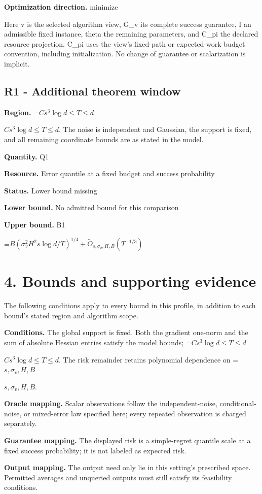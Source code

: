 \documentclass[10pt,a4paper]{article}
\newcommand{\AtlasMath}[1]{\par\begingroup\centering\setbox0=\hbox{$\displaystyle #1$}\ifdim\wd0>1.4\linewidth\typeout{ATLAS WIDE FORMULA: \the\wd0}\fi\ifdim\wd0>\linewidth\resizebox{\linewidth}{!}{\box0}\else\box0\fi\par\endgroup}
\newcommand{\AtlasInlineMath}[1]{\begingroup\setbox0=\hbox{$#1$}\ifdim\wd0>.4\linewidth\endgroup\AtlasMath{#1}\else\endgroup$#1$\fi}
\begin{document}
\textbf{Optimization direction.} minimize

Here v is the selected algorithm view, G\_v its complete success guarantee, I an admissible fixed instance, theta the remaining parameters, and C\_pi the declared resource projection. C\_pi uses the view's fixed-path or expected-work budget convention, including initialization. No change of guarantee or scalarization is implicit.

\subsection{R1 - Additional theorem window}
\textbf{Region.} \AtlasInlineMath{Cs^3\log d\le T\le d}. The noise is independent and Gaussian, the support is fixed, and all remaining coordinate bounds are as stated in the model.

\textbf{Quantity.} Q1

\textbf{Resource.} Error quantile at a fixed budget and success probability

\textbf{Status.} Lower bound missing

\textbf{Lower bound.} No admitted bound for this comparison

\textbf{Upper bound.} B1

\AtlasMath{B(\sigma_v^2H^2s\log d/T)^{1/4}+\widetilde{O}_{s,\sigma_v,H,B}(T^{-1/3})}
\section{4. Bounds and supporting evidence}
The following conditions apply to every bound in this profile, in addition to each bound's stated region and algorithm scope.

\textbf{Conditions.} The global support is fixed. Both the gradient one-norm and the sum of absolute Hessian entries satisfy the model bounds; \AtlasInlineMath{Cs^3\log d\le T\le d}. The risk remainder retains polynomial dependence on \AtlasInlineMath{s,\sigma_v,H,B}.

\textbf{Oracle mapping.} Scalar observations follow the independent-noise, conditional-noise, or mixed-error law specified here; every repeated observation is charged separately.

\textbf{Guarantee mapping.} The displayed risk is a simple-regret quantile scale at a fixed success probability; it is not labeled as expected risk.

\textbf{Output mapping.} The output need only lie in this setting's prescribed space. Permitted averages and unqueried outputs must still satisfy its feasibility conditions.
\end{document}
